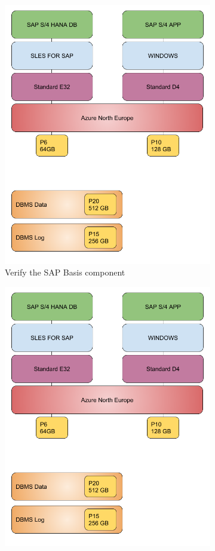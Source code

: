 \begin{figure}[h]
    \begin{subfigure}{0.5\textwidth}
        \captionsetup{width=0.8\linewidth}
        \includegraphics[width=0.9\linewidth]{img/Methodologie/SAP0.png}
        \centering
        \caption{Verify the SAP Basis component}
    \end{subfigure}
    \begin{subfigure}{0.5\textwidth}
        \captionsetup{width=0.8\linewidth}
        \includegraphics[width=0.9\linewidth]{img/Methodologie/SAP0.png} 

\end{subfigure}
\end{figure}
